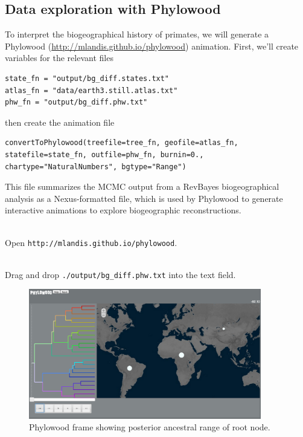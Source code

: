 \subsection{Data exploration with Phylowood}

To interpret the biogeographical history of primates, we will generate a Phylowood (\url{http://mlandis.github.io/phylowood}) animation.
First, we'll create variables for the relevant files

\begin{snugshade}
\begin{lstlisting}
state_fn = "output/bg_diff.states.txt"
atlas_fn = "data/earth3.still.atlas.txt"
phw_fn = "output/bg_diff.phw.txt"
\end{lstlisting}
\end{snugshade}

then create the animation file

\begin{snugshade}
\begin{lstlisting}
convertToPhylowood(treefile=tree_fn, geofile=atlas_fn, statefile=state_fn, outfile=phw_fn, burnin=0., chartype="NaturalNumbers", bgtype="Range")
\end{lstlisting}
\end{snugshade}

This file summarizes the MCMC output from a RevBayes biogeographical analysis as a Nexus-formatted file, which is used by Phylowood to generate interactive animations to explore biogeographic reconstructions.

\noindent \\ \impmark Open \texttt{http://mlandis.github.io/phylowood}.

\noindent \\ \impmark Drag and drop \texttt{./output/bg\_diff.phw.txt} into the text field.

\begin{figure}[H]
\centering
\includegraphics[width=4in]{figures/bg_1_mrca}
\caption{Phylowood frame showing posterior ancestral range of root node.}
\end{figure}

